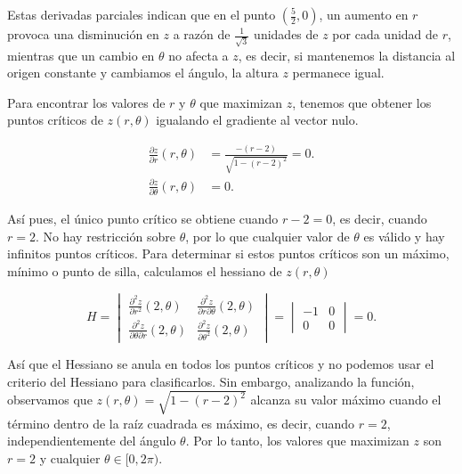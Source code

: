\documentclass[
  spanish,
  a4paper,
]{scrreport}
\theoremstyle{definition}
\theoremstyle{remark}
\begin{document}
\begin{tcolorbox}
\begin{enumerate}
  Estas derivadas parciales indican que en el punto
  \(\left(\frac{5}{2},0\right)\), un aumento en \(r\) provoca una
  disminución en \(z\) a razón de \(\frac{1}{\sqrt{3}}\) unidades de
  \(z\) por cada unidad de \(r\), mientras que un cambio en \(\theta\)
  no afecta a \(z\), es decir, si mantenemos la distancia al origen
  constante y cambiamos el ángulo, la altura \(z\) permanece igual.

  Para encontrar los valores de \(r\) y \(\theta\) que maximizan \(z\),
  tenemos que obtener los puntos críticos de \(z(r,\theta)\) igualando
  el gradiente al vector nulo.

  \begin{align*}
  \frac{\partial z}{\partial r}(r,\theta) &= \frac{-(r - 2)}{\sqrt{1 - (r - 2)^2}} = 0.\\
  \frac{\partial z}{\partial \theta}(r,\theta) &= 0.
  \end{align*}

  Así pues, el único punto crítico se obtiene cuando \(r - 2 = 0\), es
  decir, cuando \(r = 2\). No hay restricción sobre \(\theta\), por lo
  que cualquier valor de \(\theta\) es válido y hay infinitos puntos
  críticos. Para determinar si estos puntos críticos son un máximo,
  mínimo o punto de silla, calculamos el hessiano de \(z(r,\theta)\)

  \[
  H = \begin{vmatrix}
  \frac{\partial^2 z}{\partial r^2}(2,\theta) & \frac{\partial^2 z}{\partial r \partial \theta}(2,\theta) \\
  \frac{\partial^2 z}{\partial \theta \partial r}(2,\theta) & \frac{\partial^2 z}{\partial \theta^2}(2,\theta)
  \end{vmatrix} 
  = \begin{vmatrix}
  -1 & 0 \\
  0 & 0
  \end{vmatrix}
  = 0.
  \]

  Así que el Hessiano se anula en todos los puntos críticos y no podemos
  usar el criterio del Hessiano para clasificarlos. Sin embargo,
  analizando la función, observamos que
  \(z(r,\theta) = \sqrt{1 - (r - 2)^2}\) alcanza su valor máximo cuando
  el término dentro de la raíz cuadrada es máximo, es decir, cuando
  \(r=2\), independientemente del ángulo \(\theta\). Por lo tanto, los
  valores que maximizan \(z\) son \(r = 2\) y cualquier
  \(\theta \in [0, 2\pi)\).
\end{enumerate}

\end{tcolorbox}
\end{document}
